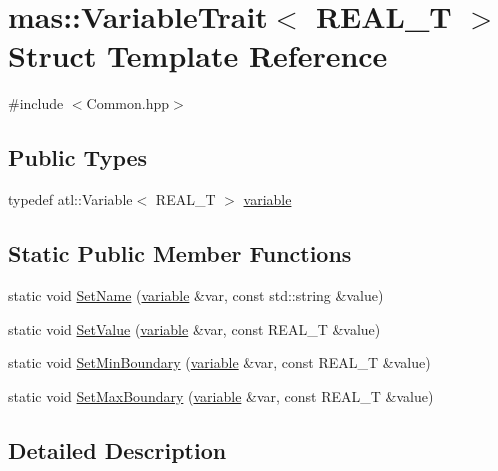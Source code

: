 \hypertarget{structmas_1_1_variable_trait}{\section{mas\-:\-:Variable\-Trait$<$ R\-E\-A\-L\-\_\-\-T $>$ Struct Template Reference}
\label{structmas_1_1_variable_trait}
}


{\ttfamily \#include $<$Common.\-hpp$>$}

\subsection*{Public Types}
\begin{DoxyCompactItemize}
\item 
typedef atl\-::\-Variable$<$ R\-E\-A\-L\-\_\-\-T $>$ \hyperlink{structmas_1_1_variable_trait_a65ff9d830a308ea0cc25a0602a71ceeb}{variable}
\end{DoxyCompactItemize}
\subsection*{Static Public Member Functions}
\begin{DoxyCompactItemize}
\item 
static void \hyperlink{structmas_1_1_variable_trait_ae208c8ad76fc3abb1f583628b2cca61b}{Set\-Name} (\hyperlink{structmas_1_1_variable_trait_a65ff9d830a308ea0cc25a0602a71ceeb}{variable} \&var, const std\-::string \&value)
\item 
static void \hyperlink{structmas_1_1_variable_trait_a5e61a90fc5dfa6c7f7a3dfabae2c0f96}{Set\-Value} (\hyperlink{structmas_1_1_variable_trait_a65ff9d830a308ea0cc25a0602a71ceeb}{variable} \&var, const R\-E\-A\-L\-\_\-\-T \&value)
\item 
static void \hyperlink{structmas_1_1_variable_trait_ac15b177162c4302e1b645a13c729c11e}{Set\-Min\-Boundary} (\hyperlink{structmas_1_1_variable_trait_a65ff9d830a308ea0cc25a0602a71ceeb}{variable} \&var, const R\-E\-A\-L\-\_\-\-T \&value)
\item 
static void \hyperlink{structmas_1_1_variable_trait_aa759ad62493d9602311875bb622ab46f}{Set\-Max\-Boundary} (\hyperlink{structmas_1_1_variable_trait_a65ff9d830a308ea0cc25a0602a71ceeb}{variable} \&var, const R\-E\-A\-L\-\_\-\-T \&value)
\end{DoxyCompactItemize}


\subsection{Detailed Description}
